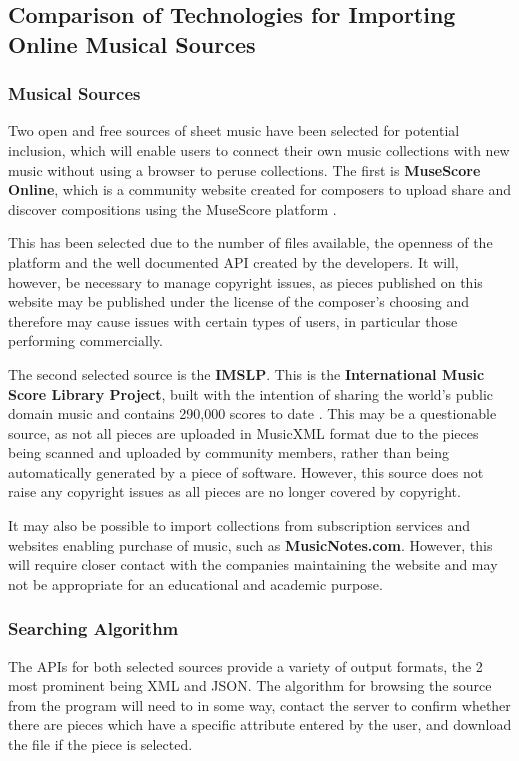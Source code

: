 \subsection{Comparison of Technologies for Importing Online Musical Sources}
\subsubsection{Musical Sources}
Two open and free sources of sheet music have been selected for potential inclusion, which will enable users to connect their own music collections with new music without using a browser to peruse collections. The first is \textbf{MuseScore Online}, which is a community website created for composers to upload share and discover compositions using the MuseScore platform \parencite{MuseShare}.

This has been selected due to the number of files available, the openness of the platform and the well documented API created by the developers. It will, however, be necessary to manage copyright issues, as pieces published on this website may be published under the license of the composer's choosing and therefore may cause issues with certain types of users, in particular those performing commercially.

The second selected source is the \textbf{IMSLP}. This is the \textbf{International Music Score Library Project}, built with the intention of sharing the world’s public domain music and contains 290,000 scores to date \parencite{imslp}. This may be a questionable source, as not all pieces are uploaded in MusicXML format due to the pieces being scanned and uploaded by community members, rather than being automatically generated by a piece of software. However, this source does not raise any copyright issues as all pieces are no longer covered by copyright.

It may also be possible to import collections from subscription services and websites enabling purchase of music, such as \textbf{MusicNotes.com}. However, this will require closer contact with the companies maintaining the website and may not be appropriate for an educational and academic purpose.

\subsubsection{Searching Algorithm}
The APIs for both selected sources provide a variety of output formats, the 2 most prominent being XML and JSON. The algorithm for browsing the source from the program will need to in some way, contact the server to confirm whether there are pieces which have a specific attribute entered by the user, and download the file if the piece is selected.


